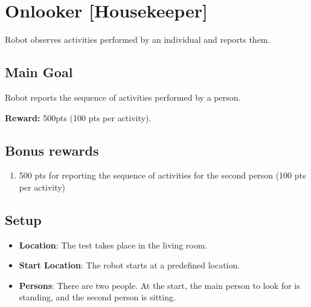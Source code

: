\section{Onlooker [Housekeeper]}
Robot observes activities performed by an individual and reports them. 


\subsection{Main Goal}
Robot reports the sequence of activities performed by a person.

\noindent\textbf{Reward:} 500pts (100 pts per activity).

\subsection{Bonus rewards}
\begin{enumerate}[nosep]
	\item 500 pts for reporting the sequence of activities for the second person (100 pts per activity)
\end{enumerate}


\subsection{Setup}
\begin{itemize}
	\item \textbf{Location}: The test takes place in the living room.

	\item \textbf{Start Location}: The robot starts at a predefined location.

	\item \textbf{Persons}: There are two people. At the start, the main person to look for is standing, and the second person is sitting.
\end{itemize}

